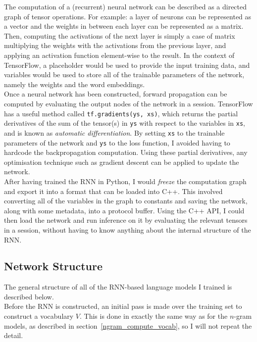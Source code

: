 \documentclass[a4paper, 12pt]{report}
\newcommand{\ttt}[1]{\texttt{#1}}
\newcommand{\tit}[1]{\textit{#1}}
\begin{document}
The computation of a (recurrent) neural network can be described as a directed graph of tensor operations. For example: a layer of neurons can be represented as a vector and the weights in between each layer can be represented as a matrix. Then, computing the activations of the next layer is simply a case of matrix multiplying the weights with the activations from the previous layer, and applying an activation function element-wise to the result. In the context of TensorFlow, a placeholder would be used to provide the input training data, and variables would be used to store all of the trainable parameters of the network, namely the weights and the word embeddings. \\

Once a neural network has been constructed, forward propagation can be computed by evaluating the output nodes of the network in a session. TensorFlow has a useful method called \ttt{tf.gradients(ys, xs)}, which returns the partial derivatives of the sum of the tensor(s) in \ttt{ys} with respect to the variables in \ttt{xs}, and is known as \tit{automatic differentiation}. By setting \ttt{xs} to the trainable parameters of the network and \ttt{ys} to the loss function, I avoided having to hardcode the backpropagation computation. Using these partial derivatives, any optimisation technique such as gradient descent can be applied to update the network. \\

After having trained the RNN in Python, I would \tit{freeze} the computation graph and export it into a format that can be loaded into C++. This involved converting all of the variables in the graph to constants and saving the network, along with some metadata, into a protocol buffer. Using the C++ API, I could then load the network and run inference on it by evaluating the relevant tensors in a session, without having to know anything about the internal structure of the RNN.

\subsection{Network Structure} \label{rnn_structure}

The general structure of all of the RNN-based language models I trained is described below. \\

Before the RNN is constructed, an initial pass is made over the training set to construct a vocabulary $V$. This is done in exactly the same way as for the $n$-gram models, as described in section~\ref{ngram_compute_vocab}, so I will not repeat the detail. \\
\end{document}
